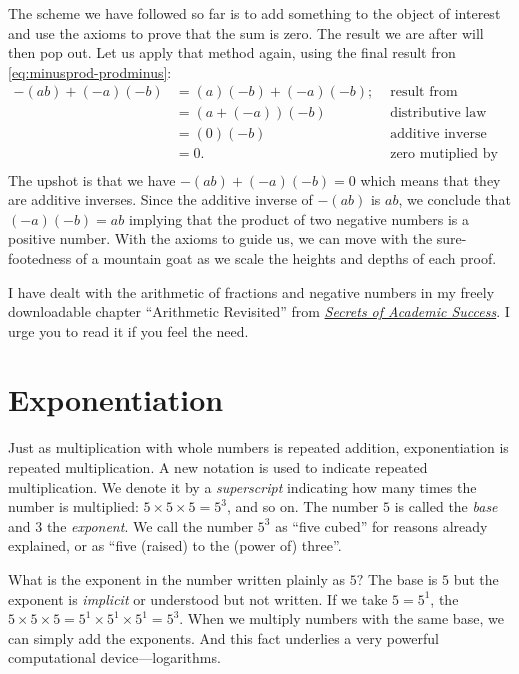 \documentclass[
  a4paper,
]{article}
\begin{document}
The scheme we have followed so far is to add something to the object of
interest and use the axioms to prove that the sum is zero. The result we
are after will then pop out. Let us apply that method again, using the
final result fron \cref{eq:minusprod-prodminus}: \[
\begin{aligned}
-(ab) + (-a)(-b) &= (a)(-b) + (-a)(-b); & \text{ result from previous section}\\
&= (a + (-a))(-b) & \text{ distributive law}\\
&= (0)(-b) & \text{ additive inverse}\\
&= 0. & \text{ zero mutiplied by anything is zero}\\
\end{aligned}
\] The upshot is that we have \(-(ab) + (-a)(-b) = 0\) which means that
they are additive inverses. Since the additive inverse of \(-(ab)\) is
\(ab\), we conclude that \((-a)(-b) = ab\) implying that the product of
two negative numbers is a positive number. With the axioms to guide us,
we can move with the sure-footedness of a mountain goat as we scale the
heights and depths of each proof.

I have dealt with the arithmetic of fractions and negative numbers in my
freely downloadable chapter ``Arithmetic Revisited'' from
\href{https://swanlotus.netlify.app/sas-manuscript/SAS-partial.pdf}{\emph{Secrets
of Academic Success}}. I urge you to read it if you feel the need.

\hypertarget{exponentiation}{%
\section{Exponentiation}\label{exponentiation}}

Just as multiplication with whole numbers is repeated addition,
exponentiation is repeated multiplication. A new notation is used to
indicate repeated multiplication. We denote it by a \emph{superscript}
indicating how many times the number is multiplied:
\(5 \times 5 \times 5 = 5^{3}\), and so on. The number \(5\) is called
the \emph{base} and \(3\) the \emph{exponent}. We call the number
\(5^{3}\) as ``five cubed'' for reasons already explained, or as ``five
(raised) to the (power of) three''.

What is the exponent in the number written plainly as \(5?\) The base is
\(5\) but the exponent is \emph{implicit} or understood but not written.
If we take \(5 = 5^{1}\), the
\(5 \times 5 \times 5 = 5^{1} \times 5^{1} \times 5^{1} = 5^{3}\). When
we multiply numbers with the same base, we can simply add the exponents.
And this fact underlies a very powerful computational
device---logarithms.
\end{document}
